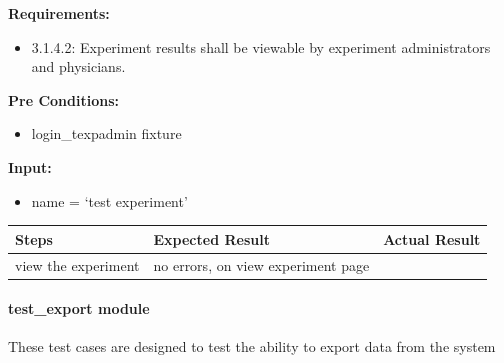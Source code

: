\documentclass[letterpaper,10pt,english]{sphinxmanual}
\begin{document}
\begin{fulllineitems}
\label{STD/test_experiment:test_experiment.test_view_experiment_physician}
\textbf{Requirements:}
\begin{itemize}
\item {} 
3.1.4.2: Experiment results shall be viewable by experiment administrators and physicians.

\end{itemize}

\textbf{Pre Conditions:}
\begin{itemize}
\item {} 
login\_texpadmin fixture

\end{itemize}

\textbf{Input:}
\begin{itemize}
\item {} 
name = `test experiment'

\end{itemize}

\begin{tabulary}{\linewidth}{|L|L|L|}
\hline
\textsf{\relax 
Steps
} & \textsf{\relax 
Expected Result
} & \textsf{\relax 
Actual Result
}\\
\hline
view the experiment
 & 
no errors, on view experiment page
 & \\
\hline\end{tabulary}


\end{fulllineitems}



\paragraph{test\_export module}
\label{STD/test_export:module-test_export}\label{STD/test_export::doc}\label{STD/test_export:test-export-module}
These test cases are designed to test the ability to export data from the system
\end{document}
